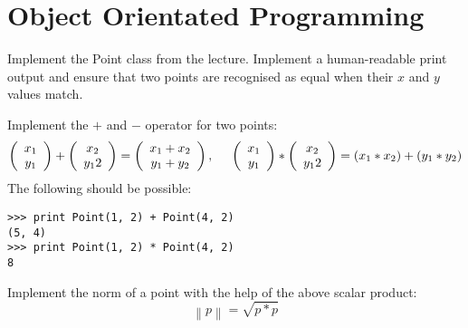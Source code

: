 \section*{Object Orientated Programming}

\begin{aufgabe}
\begin{teilaufgabe}
Implement the Point class from the lecture. Implement a human-readable print output and ensure that two points are recognised as equal when their $x$ and $y$ values match.
\end{teilaufgabe}
\begin{teilaufgabe}
Implement the $+$ and $-$ operator for two points:
\begin{displaymath}
\left(\begin{array}{c}
x_1\\
y_1
\end{array}\right)
+
\left(\begin{array}{c}
x_2\\
y_12
\end{array}\right)
=
\left(\begin{array}{c}
x_1 + x_2\\
y_1 + y_2
\end{array}\right), \hspace{5mm}
\left(\begin{array}{c}
x_1\\
y_1
\end{array}\right)
*
\left(\begin{array}{c}
x_2\\
y_12
\end{array}\right)
= (x_1 * x_2) + (y_1 * y_2)
\end{displaymath}
The following should be possible:
\begin{lstlisting}
>>> print Point(1, 2) + Point(4, 2)
(5, 4)
>>> print Point(1, 2) * Point(4, 2)
8
\end{lstlisting}
\end{teilaufgabe}

\begin{teilaufgabe}
Implement the norm of a point with the help of the above scalar product:
\begin{displaymath}
\left\| p\right\| = \sqrt{p*p}
\end{displaymath}
\end{teilaufgabe}
\end{aufgabe}

